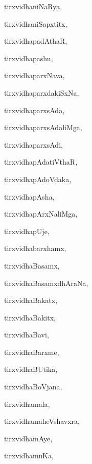 \begin{multicols}{3}
{\noindent
{tirxvidhaniNaRya}, \pageref{tirxvidhaniNaRya}

\noindent
{tirxvidhaniSapxtitx}, \pageref{tirxvidhaniSapxtitx}

\noindent
{tirxvidhapadAthaR}, \pageref{tirxvidhapadAthaR}

\noindent
{tirxvidhapashu}, \pageref{tirxvidhapashu}

\noindent
{tirxvidhaparxNava}, \pageref{tirxvidhaparxNava}

\noindent
{tirxvidhaparxdakiSxNa}, \pageref{tirxvidhaparxdakiSxNa}

\noindent
{tirxvidhaparxsAda}, \pageref{tirxvidhaparxsAda}

\noindent
{tirxvidhaparxsAdaliMga}, \pageref{tirxvidhaparxsAdaliMga}

\noindent
{tirxvidhaparxsAdi}, \pageref{tirxvidhaparxsAdi}

\noindent
{tirxvidhapAdatiVthaR}, \pageref{tirxvidhapAdatiVthaR}

\noindent
{tirxvidhapAdoVdaka}, \pageref{tirxvidhapAdoVdaka}

\noindent
{tirxvidhapAsha}, \pageref{tirxvidhapAsha}

\noindent
{tirxvidhapArxNaliMga}, \pageref{tirxvidhapArxNaliMga}

\noindent
{tirxvidhapUje}, \pageref{tirxvidhapUje}

\noindent
{tirxvidhabarxhamx}, \pageref{tirxvidhabarxhamx}

\noindent
{tirxvidhaBasamx}, \pageref{tirxvidhaBasamx}

\noindent
{tirxvidhaBasamxdhAraNa}, \pageref{tirxvidhaBasamxdhAraNa}

\noindent
{tirxvidhaBakatx}, \pageref{tirxvidhaBakatx}

\noindent
{tirxvidhaBakitx}, \pageref{tirxvidhaBakitx}

\noindent
{tirxvidhaBavi}, \pageref{tirxvidhaBavi}

\noindent
{tirxvidhaBarxme}, \pageref{tirxvidhaBarxme}

\noindent
{tirxvidhaBUtika}, \pageref{tirxvidhaBUtika}

\noindent
{tirxvidhaBoVjana}, \pageref{tirxvidhaBoVjana}

\noindent
{tirxvidhamala}, \pageref{tirxvidhamala}

\noindent
{tirxvidhamaheVshavxra}, \pageref{tirxvidhamaheVshavxra}

\noindent
{tirxvidhamAye}, \pageref{tirxvidhamAye}

\noindent
{tirxvidhamuKa}, \pageref{tirxvidhamuKa}

}
\end{multicols}
